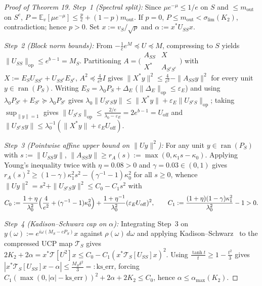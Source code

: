 \documentclass[10pt,letterpaper]{article}
\newcommand{\ran}{\operatorname{ran}}
\newcommand{\op}{\mathrm{op}}
\begin{document}
\begin{proof}[Proof of Theorem 19]
\emph{Step~1 (Spectral split):} Since $\mu e^{-\mu} \le 1/e$ on $S$ and $\le m_{\mathrm{out}}$ on $S^c$, $P = \mathbb{E}_v[\mu e^{-\mu}] \le \frac{p}{e} + (1-p)m_{\mathrm{out}}$. If $p = 0$, $P \le m_{\mathrm{out}} < \sigma_{\lim}(K_2)$, contradiction; hence $p > 0$. Set $x := v_S/\sqrt{p}$ and $\alpha := x^* U_{SS} x$.

\emph{Step~2 (Block norm bounds):} From $-\frac{1}{e}e^M \preceq U \preceq M$, compressing to $S$ yields $\|U_{SS}\|_{\op} \le e^{b-1} = M_S$. Partitioning $A = \bigl(\begin{smallmatrix} A_{SS} & X \\ X^* & A_{S^c S^c} \end{smallmatrix}\bigr)$ with $X := E_S U_{S S^c} + U_{S S^c} E_{S^c}$, $A^2 \preceq \frac{4}{e^2}I$ gives $\|X^* y\|^2 \le \frac{4}{e^2} - \|A_{SS} y\|^2$ for every unit $y \in \ran(P_S)$. Writing $E_S = \lambda_0 P_S + \Delta_E$ ($\|\Delta_E\|_{\op} \le \varepsilon_E$) and using $\lambda_0 P_{S^c} + E_{S^c} \succeq \lambda_0 P_{S^c}$ gives $\lambda_0\|U_{S^c S} y\| \le \|X^* y\| + \varepsilon_E\|U_{S^c S}\|_{\op}$; taking $\sup_{\|y\|=1}$ gives $\|U_{S^c S}\|_{\op} \le \frac{2/e}{\lambda_0 - \varepsilon_E} = 2e^{b-1} = U_{\mathrm{off}}$ and $\|U_{S^c S} y\| \le \lambda_0^{-1}(\|X^* y\| + \varepsilon_E U_{\mathrm{off}})$.

\emph{Step~3 (Pointwise affine upper bound on $\|Uy\|^2$):} For any unit $y \in \ran(P_S)$ with $s := \|U_{SS} y\|$, $\|A_{SS} y\| \ge r_A(s) := \max(0, \kappa_1 s - \kappa_0)$. Applying Young's inequality twice with $\eta = 0.08 > 0$ and $\gamma = 0.03 \in (0, 1)$ gives $r_A(s)^2 \ge (1-\gamma)\kappa_1^2 s^2 - (\gamma^{-1}-1)\kappa_0^2$ for all $s \ge 0$, whence $\|Uy\|^2 = s^2 + \|U_{S^c S} y\|^2 \le C_0 - C_1 s^2$ with
\[
  C_0 := \frac{1+\eta}{\lambda_0^2}\Bigl(\frac{4}{e^2} + (\gamma^{-1}-1)\kappa_0^2\Bigr) + \frac{1+\eta^{-1}}{\lambda_0^2}(\varepsilon_E U_{\mathrm{off}})^2,
  \qquad
  C_1 := \frac{(1+\eta)(1-\gamma)\kappa_1^2}{\lambda_0^2} - 1 > 0.
\]

\emph{Step~4 (Kadison--Schwarz cap on $\alpha$):} Integrating Step~3 on $y(\omega) := e^{i\omega(M_S - cP_S)} x$ against $\rho(\omega)\,d\omega$ and applying Kadison--Schwarz~\cite{Kadison1952} to the compressed UCP map $\mathcal{T}_S$ gives $2K_2 + 2\alpha = x^*\mathcal{T}[U^2]x \le C_0 - C_1(x^*\mathcal{T}_S[U_{SS}]x)^2$. Using $\frac{\tanh t}{t} \ge 1 - \frac{t^2}{3}$ gives $|x^*\mathcal{T}_S[U_{SS}]x - \alpha| \le \frac{M_S \delta^2}{3} =: \mathrm{ks\_err}$, forcing $C_1(\max(0, |\alpha| - \mathrm{ks\_err}))^2 + 2\alpha + 2K_2 \le C_0$, hence $\alpha \le \alpha_{\max}(K_2)$.


\end{proof}
\end{document}
